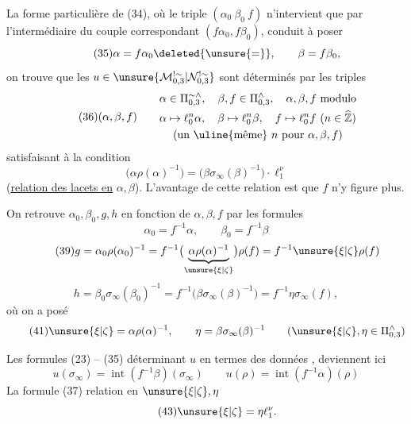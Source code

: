 La forme particulière de (34), où le triple $(\alpha_0\ \beta_0\ f)$ n'intervient que par l'intermédiaire du couple correspondant $(f\alpha_0,f\beta_0)$, conduit à poser
\[
\tag{35}
\alpha=f\alpha_0\deleted{\unsure{=}},\qquad\beta=f\beta_0,
\]
on trouve que les $u\in\unsure{\mathcal{M}_{0,3}^{!\sim}|\mathcal{N}_{0,3}^{!\sim}}$ sont déterminés par les triples
\[
\tag{36}
(\alpha,\beta,f)\qquad
\begin{gathered}
\alpha\in\Pi_{0,3}^{\sim\wedge},\quad\beta,f\in\Pi_{0,3}^{\wedge},\quad
\alpha,\beta,f\ \text{modulo}\\
\alpha\mapsto\ell_0^n\alpha,\quad\beta\mapsto\ell_0^n\beta,\quad
f\mapsto\ell_0^n f\ (n\in\widehat{\mathbb Z})\\
\text{(un \uline{même} }n\text{ pour }\alpha,\beta,f\text{)}
\end{gathered}
\]
satisfaisant à la condition
\[
\tag{37}
\boxed{\bigl(\alpha\rho(\alpha)^{-1}\bigr)
=\bigl(\beta\sigma_\infty(\beta)^{-1}\bigr)\cdot\ell_1^\nu}
\]
(\uline{relation des lacets en} $\alpha,\beta$). L'avantage de cette relation est que $f$ n'y figure plus.

On retrouve $\alpha_0,\beta_0,g,h$ en fonction de $\alpha,\beta,f$ par les formules
\[
\tag{38}
\alpha_0=f^{-1}\alpha,\qquad\beta_0=f^{-1}\beta
\]
\[
\tag{39}
g=\alpha_0\rho(\alpha_0)^{-1}
=f^{-1}\bigl(\underbrace{\alpha\rho(\alpha)^{-1}}_{\unsure{\xi|\zeta}}\bigr)\rho(f)
=f^{-1}\unsure{\xi|\zeta}\rho(f)
\]
\[
\tag{40}
h=\beta_0\sigma_\infty(\beta_0)^{-1}
=f^{-1}\bigl(\beta\sigma_\infty(\beta)^{-1}\bigr)
=f^{-1}\eta\sigma_\infty(f),
\]
où on a posé
\[
\tag{41}
\unsure{\xi|\zeta}=\alpha\rho(\alpha)^{-1},\qquad
\eta=\beta\sigma_\infty(\beta)^{-1}
\qquad(\unsure{\xi|\zeta},\eta\in\Pi_{0,3}^{\wedge})
\]


Les formules (23) -- (35) déterminant $u$ en termes des données , deviennent ici
\[
\tag{42}
u(\sigma_\infty)=\operatorname{int}(f^{-1}\beta)(\sigma_\infty)
\qquad u(\rho)=\operatorname{int}(f^{-1}\alpha)(\rho)
\]
La formule (37)  relation en $\unsure{\xi|\zeta},\eta$
\[
\tag{43}
\unsure{\xi|\zeta}=\eta\ell_1^\nu.
\]

